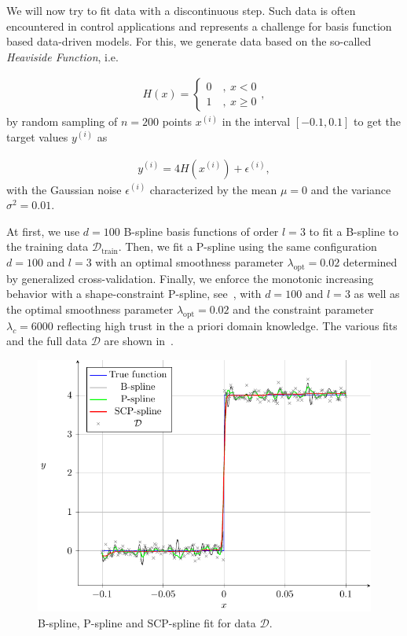 We will now try to fit data with a discontinuous step. Such data is often encountered in control applications and represents a challenge for basis function based data-driven models. For this, we generate data based on the so-called \emph{Heaviside Function}, i.e.

\begin{align} \label{eq:heaviside}
	H(x) = \begin{cases}
		0 \quad , \ x<0 \\
		1 \quad , \ x \ge 0
	\end{cases},
\end{align}
%
by random sampling of $n=200$ points $x^{(i)}$ in the interval $[-0.1, 0.1]$ to get the target values $y^{(i)}$ as

\begin{align}
	y^{(i)} = 4H(x^{(i)}) + \epsilon^{(i)},
\end{align}
%
with the Gaussian noise $\epsilon^{(i)}$ characterized by the mean $\mu = 0$ and the variance $\sigma^2 = 0.01$.

At first, we use $d=100$ B-spline basis functions of order $l=3$ to fit a B-spline to the training data $\mathcal{D}_{\mathrm{train}}$. Then, we fit a P-spline using the same configuration $d=100$ and $l=3$ with an optimal smoothness parameter $\lambda_{\mathrm{opt}} = 0.02$ determined by generalized cross-validation. Finally, we enforce the monotonic increasing behavior with a shape-constraint P-spline, see~, with $d=100$ and $l=3$ as well as the optimal smoothness parameter $\lambda_{\mathrm{opt}}=0.02$ and the constraint parameter $\lambda_c=6000$ reflecting high trust in the a priori domain knowledge. The various fits and the full data $\mathcal D$ are shown in~.

\begin{figure}[H]
	\centering
	\includegraphics{graphics/pgfplots/cha4/exp-heaviside.pdf}
	\caption{B-spline, P-spline and SCP-spline fit for data $\mathcal{D}$.}
	\label{fig:example-heaviside}
\end{figure}

